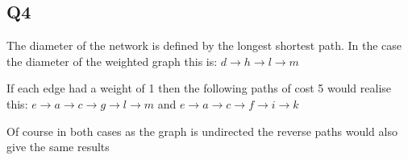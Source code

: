 \documentclass[11pt]{article}
\begin{document}
\subsection*{Q4}
The diameter of the network is defined by the longest shortest path. In the case
the diameter of the weighted graph this is:
$d \rightarrow h \rightarrow l \rightarrow m$

If each edge had a weight of 1 then the following paths of cost 5 would realise this:
$ e \rightarrow a \rightarrow c \rightarrow g \rightarrow l \rightarrow m$ and
$e \rightarrow a \rightarrow c \rightarrow f \rightarrow i \rightarrow k$

Of course in both cases as the graph is undirected the reverse paths would also give the same results
\end{document}
